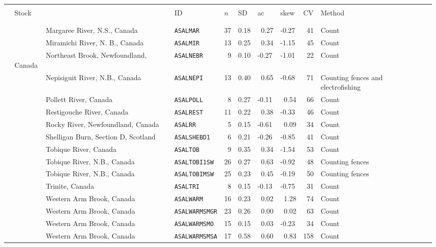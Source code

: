 \begin{flushleft}
\begin{tabular*}{7.1in}{llllllllll} 
\hline \\ 
&{\normalsize Stock}&{\normalsize ID}&{\normalsize $n$}&{\normalsize SD}&{\normalsize ac}&{\normalsize skew}&{\normalsize CV}&{\normalsize Method}  & \\ 
 &&&&&&&&&\\ 
  \hline  &&&&&&&&&\\ 
&~~~~~~~~~Margaree River, N.S., Canada&{\tt ASALMAR}&37&0.18&~0.27&-0.27&~41&Count  & \\ 
&~~~~~~~~~Miramichi River, N. B., Canada&{\tt ASALMIR}&13&0.25&~0.34&-1.15&~45&Count  & \\ 
&~~~~~~~~~Northeast Brook, Newfoundland, Canada&{\tt ASALNEBR}&~9&0.10&-0.27&-1.01&~22&Count  & \\ 
&~~~~~~~~~Nepisiguit River, N.B., Canada&{\tt ASALNEPI}&13&0.40&~0.65&-0.68&~71&Counting fences and electrofishing  & \\ 
&~~~~~~~~~Pollett River, Canada&{\tt ASALPOLL}&~8&0.27&-0.11&~0.54&~66&Count  & \\ 
&~~~~~~~~~Restigouche River, Canada&{\tt ASALREST}&11&0.22&~0.38&-0.33&~46&Count  & \\ 
&~~~~~~~~~Rocky River, Newfoundland, Canada&{\tt ASALRR}&~5&0.15&-0.61&~0.09&~34&Count  & \\ 
&~~~~~~~~~Shelligan Burn, Section D, Scotland&{\tt ASALSHEBD1}&~6&0.21&-0.26&-0.85&~41&Count  & \\ 
&~~~~~~~~~Tobique River, Canada&{\tt ASALTOB}&~9&0.35&~0.34&-1.54&~53&Count  & \\ 
&~~~~~~~~~Tobique River, N.B., Canada&{\tt ASALTOBI1SW}&26&0.27&~0.63&-0.92&~48&Counting fences  & \\ 
&~~~~~~~~~Tobique River, N.B., Canada&{\tt ASALTOBIMSW}&25&0.23&~0.45&-0.19&~50&Counting fences  & \\ 
&~~~~~~~~~Trinite, Canada&{\tt ASALTRI}&~8&0.15&-0.13&-0.75&~31&Count  & \\ 
&~~~~~~~~~Western Arm Brook, Canada&{\tt ASALWARM}&16&0.23&~0.02&~1.28&~74&Count  & \\ 
&~~~~~~~~~Western Arm Brook, Canada&{\tt ASALWARMSMGR}&23&0.26&~0.00&~0.02&~63&Count  & \\ 
&~~~~~~~~~Western Arm Brook, Canada&{\tt ASALWARMSMO}&15&0.15&~0.03&-0.23&~34&Count  & \\ 
&~~~~~~~~~Western Arm Brook, Canada&{\tt ASALWARMSMSA}&17&0.58&~0.60&~0.83&158&Count  & \\ 

\end{tabular*}
\end{flushleft}
